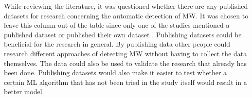While reviewing the literature, it was questioned whether there are any published datasets for research concerning the automatic detection of MW. It was chosen to leave this column out of the table since only one of the studies mentioned a published dataset or published their own dataset \cite{Zhao2017ScalableApproach}. Publishing datasets could be beneficial for the research in general. By publishing data other people could research different approaches of detecting MW without having to collect the data themselves. The data could also be used to validate the research that already has been done. Publishing datasets would also make it easier to test whether a certain ML algorithm that has not been tried in the study itself would result in a better model.